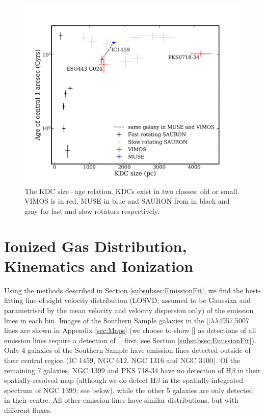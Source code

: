\documentclass[a4paper,fleqn,usenatbib]{mnras}
\begin{document}
		\begin{figure}
			\includegraphics[width=\columnwidth]{KDC_size_age.png}
			\caption[KDC dichotomy]{The KDC size\,--\,age relation. KDCs exist in two classes: old or small. VIMOS is in red, MUSE in blue and SAURON from \citet{Kuntschner2010} in black and gray for fast and slow rotators respectively.}
			\label{fig:KDC}
		\end{figure}


\section{Ionized Gas Distribution, Kinematics and Ionization}
	\label{sec:gas}
	Using the methods described in Section \ref{subsubsec:EmissionFit}, we find the best-fitting line-of-sight velocity distribution (LOSVD; assumed to be Gaussian and parametrised by the mean velocity and velocity dispersion only) of the emission lines in each bin. Images of the Southern Sample galaxies in the []$\lambda\lambda$4957,5007 lines are shown in Appendix \ref{sec:Maps} (we choose to show [] as detections of all emission lines require a detection of [] first, see Section \ref{subsubsec:EmissionFit}). Only 4 galaxies of the Southern Sample have emission lines detected outside of their central region (IC 1459, NGC 612, NGC 1316 and NGC 3100). Of the remaining 7 galaxies, NGC 1399 and PKS 718-34 have no detection of H$\beta$ in their spatially-resolved map (although we do detect H$\beta$ in the spatially-integrated spectrum of NGC 1399; see below), while the other 5 galaxies are only detected in their centre. All other emission lines have similar distributions, but with different fluxes.
\end{document}

